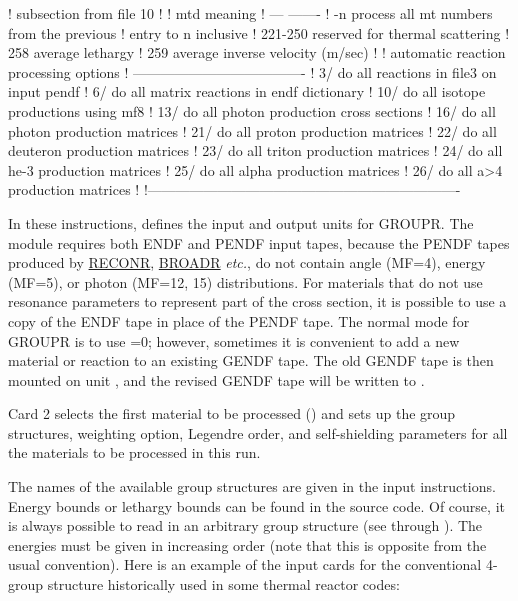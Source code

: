 \begin{ccode}
   !                     subsection from file 10
   !
   !     mtd          meaning
   !     ---          -------
   !     -n           process all mt numbers from the previous
   !                          entry to n inclusive
   !     221-250      reserved for thermal scattering
   !     258          average lethargy
   !     259          average inverse velocity (m/sec)
   !
   !     automatic reaction processing options
   !     -------------------------------------
   !        3/        do all reactions in file3 on input pendf
   !        6/        do all matrix reactions in endf dictionary
   !       10/        do all isotope productions using mf8
   !       13/        do all photon production cross sections
   !       16/        do all photon production matrices
   !       21/        do all proton production matrices
   !       22/        do all deuteron production matrices
   !       23/        do all triton production matrices
   !       24/        do all he-3 production matrices
   !       25/        do all alpha production matrices
   !       26/        do all a>4 production matrices
   !
   !-------------------------------------------------------------------

\end{ccode}
\normalsize

In these instructions,  defines the input and output units
for GROUPR.  The module requires both ENDF and PENDF input tapes,
because the PENDF tapes produced by
\hyperlink{sRECONRhy}{RECONR},
\hyperlink{sBROADRhy}{BROADR} {\it etc.}, do not
contain angle (MF=4),
energy (MF=5), or photon (MF=12, 15) distributions.  For materials
that do not use resonance parameters to represent part of the
cross section, it is possible to use a copy of the ENDF tape in place
of the PENDF tape.  The normal mode for GROUPR is to use =0;
however, sometimes it is convenient to add a new material or reaction to
an existing GENDF tape.  The old GENDF tape is then mounted on unit
, and the revised GENDF tape will be written to .

Card 2 selects the first material to be processed () and sets
up the group structures,
weighting option, Legendre order, and
self-shielding parameters for all the materials
to be processed in this run.

The names of the available group structures are given in the input
instructions. Energy bounds or lethargy bounds can be found in the
source code.  Of course, it is always possible to read in an arbitrary
group structure (see  through ).  The energies
must be given in increasing order (note that this is opposite from the
usual convention).  Here is an example of the input cards for the
conventional 4-group structure historically used in some thermal
reactor codes:

